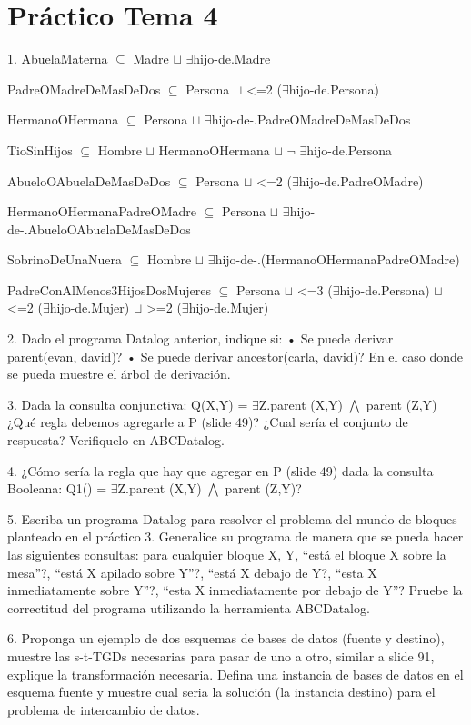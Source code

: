 \chapter{Práctico Tema 4}

1. AbuelaMaterna $\subseteq$ Madre $\sqcup$ $\exists$hijo-de.Madre


PadreOMadreDeMasDeDos $\subseteq$ Persona $\sqcup$ <=2 ($\exists$hijo-de.Persona)

HermanoOHermana $\subseteq$ Persona $\sqcup$ $\exists$hijo-de-.PadreOMadreDeMasDeDos

TioSinHijos $\subseteq$ Hombre $\sqcup$ HermanoOHermana $\sqcup$ $\neg$ $\exists$hijo-de.Persona


AbueloOAbuelaDeMasDeDos $\subseteq$ Persona $\sqcup$ <=2 ($\exists$hijo-de.PadreOMadre)

HermanoOHermanaPadreOMadre $\subseteq$ Persona $\sqcup$ $\exists$hijo-de-.AbueloOAbuelaDeMasDeDos

SobrinoDeUnaNuera $\subseteq$ Hombre $\sqcup$ $\exists$hijo-de-.(HermanoOHermanaPadreOMadre)


PadreConAlMenos3HijosDosMujeres $\subseteq$ Persona $\sqcup$ <=3 ($\exists$hijo-de.Persona) $\sqcup$ <=2 ($\exists$hijo-de.Mujer) $\sqcup$ >=2 ($\exists$hijo-de.Mujer)



2. Dado el programa Datalog anterior, indique si: • Se puede derivar parent(evan, david)? • Se puede derivar ancestor(carla, david)? En el caso donde se pueda muestre el árbol de derivación. 

3. Dada la consulta conjunctiva: Q(X,Y) = $\exists$Z.parent (X,Y) $\bigwedge$ parent (Z,Y) ¿Qué regla debemos agregarle a P (slide 49)? ¿Cual sería el conjunto de respuesta? Verifiquelo en ABCDatalog.

4. ¿Cómo sería la regla que hay que agregar en P (slide 49) dada la consulta Booleana: Q1() = $\exists$Z.parent (X,Y) $\bigwedge$ parent (Z,Y)? 

5. Escriba un programa Datalog para resolver el problema del mundo de bloques planteado en el práctico 3. Generalice su programa de manera que se pueda hacer las siguientes consultas: para cualquier bloque X, Y, “está el bloque X sobre la mesa”?, “está X apilado sobre Y”?, “está X debajo de Y?, “esta X inmediatamente sobre Y”?, “esta X inmediatamente por debajo de Y”? Pruebe la correctitud del programa utilizando la herramienta ABCDatalog. 

6. Proponga un ejemplo de dos esquemas de bases de datos (fuente y destino), muestre las s-t-TGDs necesarias para pasar de uno a otro, similar a slide 91, explique la transformación necesaria. Defina una instancia de bases de datos en el esquema fuente y muestre cual seria la solución (la instancia destino) para el problema de intercambio de datos.

\bigskip